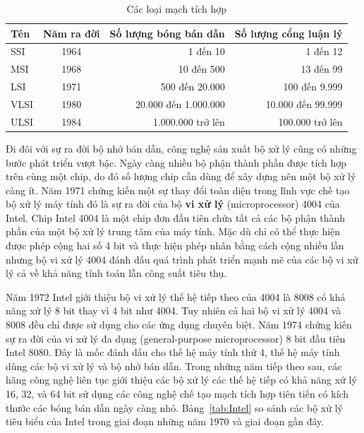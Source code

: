 \begin{table}[!h]
	\small
	\caption{Các loại mạch tích hợp}
	\label{tab:VLSI}
		\begin{tabular}{l||c|r|r}
			\hline
			\textbf{Tên} & \textbf{Năm ra đời} & \textbf{Số lượng bóng bán dẫn} & \textbf{Số lượng cổng luận lý} \\
			\hline
			\hline
			SSI & 1964 & 1 đến 10 & 1 đến 12 \\
			\hline
			MSI & 1968 & 10 đến 500 & 13 đến 99 \\
			\hline
			LSI & 1971 & 500 đến 20.000 & 100 đến 9.999 \\
			\hline
			VLSI & 1980 & 20.000 đến 1.000.000 & 10.000 đến 99.999 \\
			\hline
			ULSI & 1984 & 1.000.000 trở lên & 100.000 trở lên\\
			\hline
		\end{tabular}
\end{table}

Đi đôi với sự ra đời bộ nhớ bán dẫn, công nghệ sản xuất bộ xử lý cũng có những bước phát triển vượt bậc. Ngày càng nhiều bộ phận thành phần được tích hợp trên cùng một chip, do đó số lượng chip cần dùng để xây dựng nên một bộ xử lý càng ít. Năm 1971 chứng kiến một sự thay đổi toàn diện trong lĩnh vực chế tạo bộ xử lý máy tính đó là sự ra đời của bộ \textbf{vi xử lý} (microprocessor) 4004 của Intel. Chip Intel 4004 là một chip đơn đầu tiên chứa tất cả các bộ phận thành phần của một bộ xử lý trung tâm của máy tính. Mặc dù chỉ có thể thực hiện được phép cộng hai số 4 bit và thực hiện phép nhân bằng cách cộng nhiều lần nhưng bộ vi xử lý 4004 đánh dấu quá trình phát triển mạnh mẽ của các bộ vi xử lý cả về khả năng tính toán lẫn công suất tiêu thụ.

Năm 1972 Intel giới thiệu bộ vi xử lý thế hệ tiếp theo của 4004 là 8008 có khả năng xử lý 8 bit thay vì 4 bit như 4004. Tuy nhiên cả hai bộ vi xử lý 4004 và 8008 đều chỉ được sử dụng cho các ứng dụng chuyên biệt. Năm 1974 chứng kiến sự ra đời của vi xử lý đa dụng (general-purpose microprocessor) 8 bit đầu tiên Intel 8080. Đây là mốc đánh dấu cho thế hệ máy tính thứ 4, thế hệ máy tính dùng các bộ vi xử lý và bộ nhớ bán dẫn. Trong những năm tiếp theo sau, các hãng công nghệ liên tục giới thiệu các bộ xử lý các thế hệ tiếp có khả năng xử lý 16, 32, và 64 bit sử dụng các công nghệ chế tạo mạch tích hợp tiên tiến có kích thước các bóng bán dẫn ngày càng nhỏ. Bảng~\ref{tab:Intel} so sánh các bộ xử lý tiêu biểu của Intel trong giai đoạn những năm 1970 và giai đoạn gần đây.

